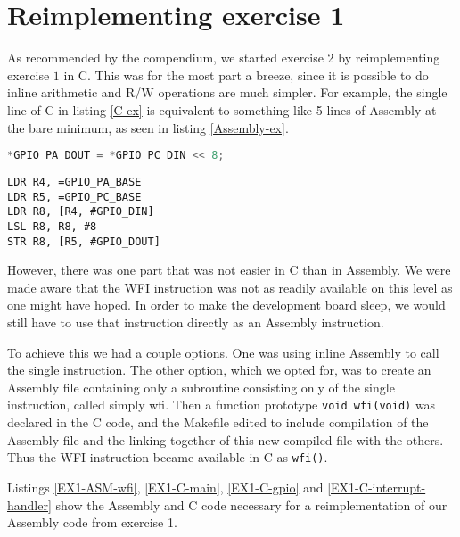 \section{Reimplementing exercise 1\label{sec:reimplementing_ex1}}

As recommended by the compendium, we started exercise 2 by reimplementing exercise $1$ in C. This was for the most part a breeze, since it is possible to do inline arithmetic and R/W operations are much simpler. For example, the single line of C in listing \ref{C-ex} is equivalent to something like 5 lines of Assembly at the bare minimum, as seen in listing \ref{Assembly-ex}.

\begin{lstlisting}[language=C,label=C-ex,caption=C]
*GPIO_PA_DOUT = *GPIO_PC_DIN << 8;
\end{lstlisting}

\begin{lstlisting}[label=Assembly-ex,caption=ASM]
LDR R4, =GPIO_PA_BASE
LDR R5, =GPIO_PC_BASE
LDR R8, [R4, #GPIO_DIN]
LSL R8, R8, #8
STR R8, [R5, #GPIO_DOUT]
\end{lstlisting}

However, there was one part that was not easier in C than in Assembly. We were made aware that the WFI instruction was not as readily available on this level as one might have hoped. In order to make the development board sleep, we would still have to use that instruction directly as an Assembly instruction.

To achieve this we had a couple options. One was using inline Assembly to call the single instruction. The other option, which we opted for, was to create an Assembly file containing only a subroutine consisting only of the single instruction, called simply wfi. Then a function prototype \texttt{void wfi(void)} was declared in the C code, and the Makefile edited to include compilation of the Assembly file and the linking together of this new compiled file with the others. Thus the WFI instruction became available in C as \texttt{wfi()}.

Listings \ref{EX1-ASM-wfi}, \ref{EX1-C-main}, \ref{EX1-C-gpio} and \ref{EX1-C-interrupt-handler} show the Assembly and C code necessary for a reimplementation of our Assembly code from exercise 1.

